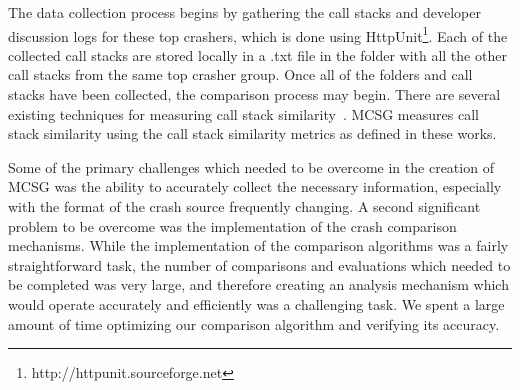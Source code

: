 \documentclass{llncs}
\newcommand{\todo}[1]{\textcolor{cyan}{\textbf{[#1]}}}
\begin{document}
The data collection process begins by gathering the call stacks and developer discussion logs for these top crashers, which is done using HttpUnit\footnote{http://httpunit.sourceforge.net}. Each of the collected call stacks are stored locally in a .txt file in the folder with all the other call stacks from the same top crasher group. Once all of the folders and call stacks have been collected, the comparison process may begin. There are several existing techniques for measuring call stack similarity~\cite{Bartz:2008:FSF:1855895.1855896, 4401026}. MCSG measures call stack similarity using the call stack similarity metrics as defined in these works. %

Some of the primary challenges which needed to be overcome in the creation of MCSG was the ability to accurately collect the necessary information, especially with the format of the crash source frequently changing.  A second significant problem to be overcome was the implementation of the crash comparison mechanisms. While the implementation of the comparison algorithms was a fairly straightforward task, the number of comparisons and evaluations which needed to be completed was very large, and therefore creating an analysis mechanism which would operate accurately and efficiently was a challenging task. We spent a large amount of time optimizing our comparison algorithm and verifying its accuracy.






\end{document}
